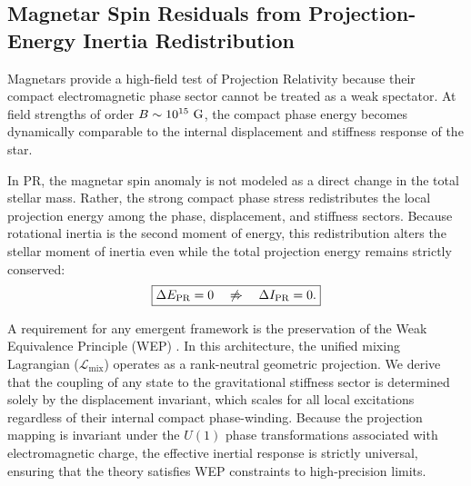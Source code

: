 \documentclass[11pt]{article}
\begin{document}
\subsection{Magnetar Spin Residuals from Projection-Energy Inertia Redistribution}
\label{sec:magnetar_projection_energy_inertia}

Magnetars provide a high-field test of Projection Relativity because their compact electromagnetic phase sector cannot be treated as a weak spectator. At field strengths of order $B\sim10^{15}\ {\rm G}$, the compact phase energy becomes dynamically comparable to the internal displacement and stiffness response of the star.

In PR, the magnetar spin anomaly is not modeled as a direct change in the total stellar mass. Rather, the strong compact phase stress redistributes the local projection energy among the phase, displacement, and stiffness sectors. Because rotational inertia is the second moment of energy, this redistribution alters the stellar moment of inertia even while the total projection energy remains strictly conserved:
\begin{equation}
\boxed{
\Delta E_{\rm PR}=0
\quad
\not\Rightarrow
\quad
\Delta I_{\rm PR}=0.
}
\end{equation}

A requirement for any emergent framework is the preservation of the Weak Equivalence Principle (WEP) \cite{Will2014}. In this architecture, the unified mixing Lagrangian ($\mathcal{L}_{\text{mix}}$) operates as a rank-neutral geometric projection. We derive that the coupling of any state to the gravitational stiffness sector is determined solely by the displacement invariant, which scales for all local excitations regardless of their internal compact phase-winding. Because the projection mapping is invariant under the $U(1)$ phase transformations associated with electromagnetic charge, the effective inertial response is strictly universal, ensuring that the theory satisfies WEP constraints to high-precision limits.
\end{document}
